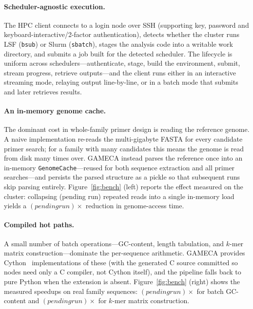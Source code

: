 \documentclass[11pt]{article}
\providecommand{\genomecacheSpeedup}{(pending run)}
\providecommand{\genomecacheReads}{(pending run)}
\providecommand{\cythonSpeedupGC}{(pending run)}
\providecommand{\cythonSpeedupKmer}{(pending run)}
\begin{document}
\paragraph{Scheduler-agnostic execution.}
The HPC client connects to a login node over SSH (supporting key, password and
keyboard-interactive/2-factor authentication), detects whether the cluster runs LSF
(\texttt{bsub}) or Slurm (\texttt{sbatch}), stages the analysis code into a writable work
directory, and submits a job built for the detected scheduler. The lifecycle is uniform
across schedulers---authenticate, stage, build the environment, submit, stream progress,
retrieve outputs---and the client runs either in an interactive streaming mode, relaying
output line-by-line, or in a batch mode that submits and later retrieves results.

\paragraph{An in-memory genome cache.}
The dominant cost in whole-family primer design is reading the reference genome. A naive
implementation re-reads the multi-gigabyte FASTA for every candidate primer search; for a
family with many candidates this means the genome is read from disk many times over. GAMECA
instead parses the reference once into an in-memory \texttt{GenomeCache}---reused for both
sequence extraction and all primer searches---and persists the parsed structure as a pickle
so that subsequent runs skip parsing entirely. Figure~\ref{fig:bench} (left) reports the
effect measured on the cluster: collapsing \genomecacheReads{} repeated reads into a single
in-memory load yields a $\genomecacheSpeedup{}\times$ reduction in genome-access time.

\paragraph{Compiled hot paths.}
A small number of batch operations---GC-content, length tabulation, and $k$-mer matrix
construction---dominate the per-sequence arithmetic. GAMECA provides
Cython~\citep{behnel2011cython} implementations of these (with the generated C source
committed so nodes need only a C compiler, not Cython itself), and the pipeline falls back to
pure Python when the extension is absent. Figure~\ref{fig:bench} (right) shows the measured
speedups on real family sequences: $\cythonSpeedupGC{}\times$ for batch GC-content and
$\cythonSpeedupKmer{}\times$ for $k$-mer matrix construction.
\end{document}
